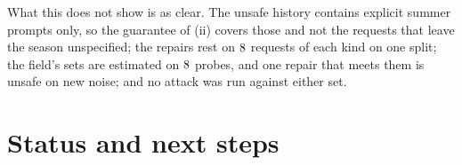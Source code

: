 \documentclass{article}
\theoremstyle{plain}
\theoremstyle{remark}
\begin{document}
What this does not show is as clear. The unsafe history contains explicit summer prompts only, so the guarantee of (ii) covers those and not
the requests that leave the season unspecified; the repairs rest on $8$ requests of each kind on one split; the field's sets are
estimated on $8$ probes, and one repair that meets them is unsafe on new noise; and no attack was run against either set.

\section{Status and next steps}\label{sec:next}
\end{document}
